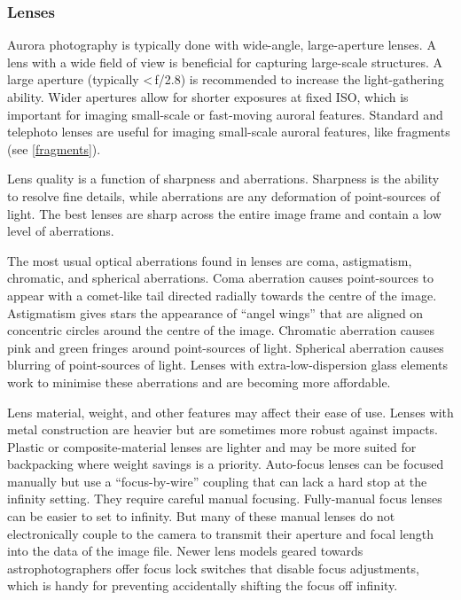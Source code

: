 \documentclass{article}
\begin{document}
\subsubsection{Lenses}
Aurora photography is typically done with wide-angle, large-aperture lenses. A lens with a wide field of view is beneficial for capturing large-scale structures. A large aperture (typically <\,f/2.8) is recommended to increase the light-gathering ability. Wider apertures allow for shorter exposures at fixed ISO, which is important for imaging small-scale or fast-moving auroral features. Standard and telephoto lenses are useful for imaging small-scale auroral features, like fragments (see \ref{fragments}).

Lens quality is a function of sharpness and aberrations. Sharpness is the ability to resolve fine details, while aberrations are any deformation of point-sources of light. The best lenses are sharp across the entire image frame and contain a low level of aberrations. 

The most usual optical aberrations found in lenses are coma, astigmatism, chromatic, and spherical aberrations. Coma aberration causes point-sources to appear with a comet-like tail directed radially towards the centre of the image. Astigmatism gives stars the appearance of ``angel wings'' that are aligned on concentric circles around the centre of the image. Chromatic aberration causes pink and green fringes around point-sources of light. Spherical aberration causes blurring of point-sources of light. Lenses with extra-low-dispersion glass elements work to minimise these aberrations and are becoming more affordable.

Lens material, weight, and other features may affect their ease of use. Lenses with metal construction are heavier but are sometimes more robust against impacts. Plastic or composite-material lenses are lighter and may be more suited for backpacking where weight savings is a priority. Auto-focus lenses can be focused manually but use a ``focus-by-wire'' coupling that can lack a hard stop at the infinity setting. They require careful manual focusing. Fully-manual focus lenses can be easier to set to infinity. But many of these manual lenses do not electronically couple to the camera to transmit their aperture and focal length into the data of the image file. Newer lens models geared towards astrophotographers offer focus lock switches that disable focus adjustments, which is handy for preventing accidentally shifting the focus off infinity. 
\end{document}
